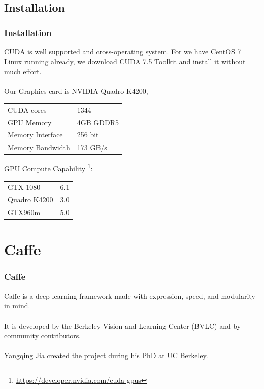 \documentclass[10pt, mathserif]{beamer}	%
\newcommand{\ftitle}[1]{\frametitle{\hspace{4ex} {#1}}}	%
\begin{document}
\begin{CJK}{UTF8}{song}
\subsection{Installation}
\begin{frame}
	\ftitle{Installation}
	CUDA is well supported and cross-operating system. For we have {\color{red} CentOS 7 Linux} running already, we download CUDA 7.5 Toolkit and install it without much effort.\\
	~\\
	Our Graphics card is {\color{red} NVIDIA Quadro K4200}, \\
	\begin{table}[htbp]
	\begin{tabular}{ll}
		CUDA cores	& 1344 \\
		GPU Memory	& 4GB GDDR5 \\
		Memory Interface &  256 bit \\
		Memory Bandwidth & 173 GB/s  \\
	\end{tabular}		
	\end{table}
	GPU Compute Capability \footnote{\url{https://developer.nvidia.com/cuda-gpus}}:
	\begin{table}[htbp]
		\begin{tabular}{ll}
			GTX 1080	& 6.1 \\
			\underline{Quadro K4200} & \underline{{\color{red} 3.0}}  \\
			GTX960m &  5.0 
		\end{tabular}		
	\end{table}
\end{frame}

\section{Caffe}
\begin{frame}
	\ftitle{Caffe}
	Caffe \cite{jia2014caffe} is a deep learning framework made with expression, speed, and modularity in mind.\\
	~\\
	It is developed by the Berkeley Vision and Learning Center (BVLC) and by community contributors. \\
	~\\
	Yangqing Jia created the project during his PhD at UC Berkeley.
\end{frame}


\end{CJK}
\end{document}
